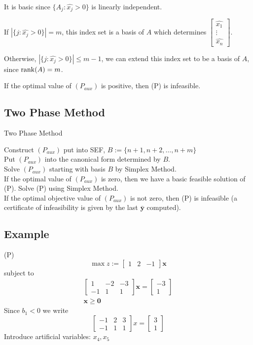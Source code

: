 It is basic since $ \{A_j : \hat{x_j}>0\} $ is linearly independent.

If $ |\{j:\hat{x_j}>0\}|=m $, this index set is a basis of $ A $ which
determines 
$ 
\begin{bmatrix}
    \hat{x_1}\\
    \vdots\\
    \hat{x_{n}}
\end{bmatrix}
$.

Otherwise, $ |\{j:\hat{x_j}>0\}|\le m-1 $, we can extend this index set
to be a basis of $ A $, since $ \operatorname{rank}(A)=m $.

If the optimal value of $ (P_{aux}) $ is positive, then (P) is
infeasible.

\subsection{Two Phase Method}
\begin{algorithm}
    \caption{Two Phase Method}
    Construct $ (P_{aux}) $ put into SEF, $ B:=\{n+1,n+2,\ldots,n+m\} $\\
    Put $ (P_{aux}) $ into the canonical form determined by $ B $.\\
    Solve $ (P_{aux}) $ starting with basis $ B $ by Simplex Method.\\
    If the optimal value of $ (P_{aux}) $ is zero, then we have a basic
    feasible solution of (P). Solve (P) using Simplex Method.\\
    If the optimal objective value of $ (P_{aux}) $ is not zero, then
    (P) is infeasible (a certificate of infeasibility is given by
    the last $ \bm{\bar{y}} $ computed).\\
\end{algorithm}

\subsection{Example}
(P)
\[ \max z:= \begin{bmatrix} 1 & 2 & -1 \end{bmatrix} \bm{x} \]
subject to
\begin{align}
    \begin{bmatrix}
        1 & -2 & -3\\
        -1 & 1 & 1
    \end{bmatrix}
    \bm{x} =
    \begin{bmatrix}
        -3\\
        1
    \end{bmatrix}\\
    \bm{x}\ge \bm{0}
\end{align}
Since $ b_1<0 $
we write
\[ \begin{bmatrix}
    -1 & 2 & 3\\
    -1 & 1 & 1
\end{bmatrix}
x=
\begin{bmatrix}
    3\\
    1
\end{bmatrix}
\]
Introduce artificial variables: $ x_4, x_5 $

